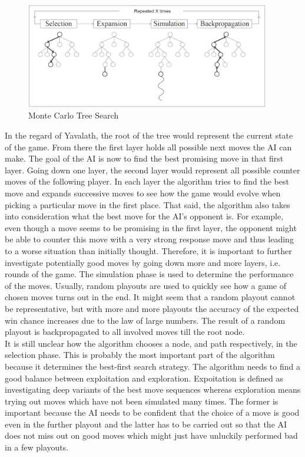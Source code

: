 \documentclass[english]{report} \usepackage[english]{babel}
\begin{document}
\begin{figure}[ht]
\centering
\includegraphics[width=0.95\textwidth]{Abbildungen/MonteCarloTreeSearch.png}
\caption[Monte Carlo Tree Search, Source:\cite{paper:mcts}]{Monte Carlo Tree Search}
\label{fig:mcts}
\end{figure}

In the regard of Yavalath, the root of the tree would represent the current
state of the game. From there the first layer holds all possible next moves the
AI can make. The goal of the AI is now to find the best promising move in that
first layer. Going down one layer, the second layer would represent all possible
counter moves of the following player. In each layer the algorithm tries to find
the best move and expands successive moves to see how the game would evolve when
picking a particular move in the first place. That said, the algorithm also
takes into consideration what the best move for the AI's opponent is. For example,
even though a move seems to be promising in the first layer, the opponent might
be able to counter this move with a very strong response move and thus leading
to a worse situation than initially thought. Therefore, it is important to
further investigate potentially good moves by going down more and more layers,
i.e. rounds of the game. The simulation phase is used to determine the
performance of the moves. Usually, random playouts are used to quickly see how a
game of chosen moves turns out in the end. It might seem that a random playout
cannot be representative, but with more and more playouts the accuracy of the
expected win chance increases due to the law of large numbers.
The result of a random playout is backpropagated to all involved moves till the
root node.\\

It is still unclear how the algorithm chooses a node, and path
respectively, in the selection phase. This is probably the most important part
of the algorithm because it determines the best-first search strategy. The
algorithm needs to find a good balance between exploitation and exploration.
Expoitation is defined as investigating deep variants of the best move sequences
whereas exploration means trying out moves which have not been simulated many
times. The former is important because the AI needs to be confident that the
choice of a move is good even in the further playout and the latter has to be
carried out so that the AI does not miss out on good moves which might just have
unluckily performed bad in a few playouts.\\
\end{document}
